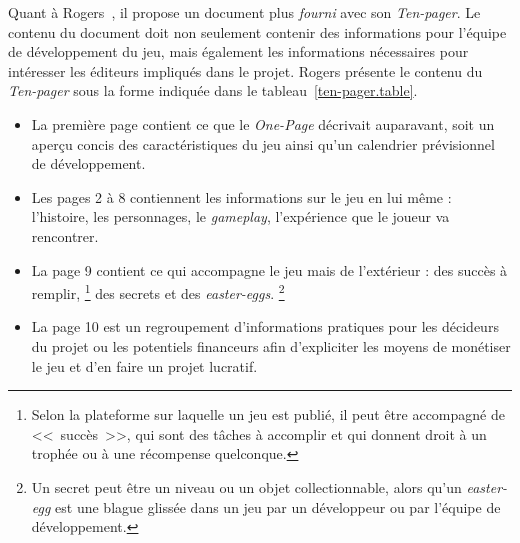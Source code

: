 Quant \`a Rogers~\cite{LevelUpRogers2014}, il  propose un document plus \emph{fourni} avec son \emph{Ten-pager}.
Le contenu du document doit non seulement contenir des informations pour l'équipe de développement du jeu, mais également les informations nécessaires pour int\'eresser les éditeurs impliqués dans le projet.
Rogers présente le contenu du \emph{Ten-pager} sous la forme indiqu\'ee dans le tableau~\ref{ten-pager.table}.


\begin{itemize}

\item La première page contient ce que le \emph{One-Page} décrivait auparavant, soit un aperçu concis des caractéristiques du jeu ainsi qu'un calendrier prévisionnel de d\'eveloppement.

\item Les pages 2 à 8 contiennent les informations sur le jeu en lui même : l'histoire, les personnages, le \emph{gameplay}, l'expérience que le joueur va rencontrer.

\item La page 9 contient ce qui accompagne le jeu mais de l'extérieur : des succès à remplir, \footnote{Selon la plateforme sur laquelle un jeu est publié, il peut être accompagné de <<~succès~>>, qui sont des tâches à accomplir et qui donnent droit à un trophée ou \`a une récompense quelconque.} des secrets et des \emph{easter-eggs}.%
%
\footnote{Un secret peut être un niveau ou un objet collectionnable, alors qu'un \emph{easter-egg} est une blague glissée dans un jeu par un développeur ou par l'équipe de développement.}


\item La page 10 est un regroupement d'informations pratiques pour les décideurs du projet ou les potentiels financeurs afin d'expliciter les moyens de monétiser le jeu et d'en faire un projet lucratif.

\end{itemize}
    


